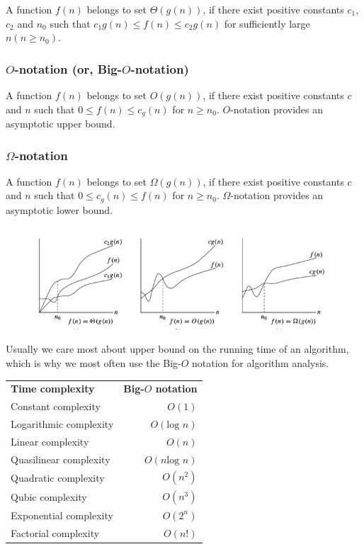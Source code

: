 \documentclass[a4paper,11pt]{book}
\begin{document}
A function $f(n)$ belongs to set $\Theta\left(g(n)\right)$, if there exist positive constants $c_1$, $c_2$ and $n_0$ such that $c_1g(n) \leq f(n) \leq c_2g(n)$ for sufficiently large $n (n \geq n_0)$.

\subsubsection{$O$-notation (or, Big-$O$-notation)}
A function $f(n)$ belongs to set $O\left(g(n)\right)$, if there exist positive constants $c$ and $n$ such that $0 \leq f(n) \leq c_g(n)$ for $n \geq n_0$. $O$-notation provides an asymptotic upper bound.

\subsubsection{$\Omega$-notation}
A function $f(n)$ belongs to set $\Omega\left(g(n)\right)$, if there exist positive constants $c$ and $n$ such that $0 \leq c_g(n) \leq f(n)$ for $n \geq n_0$. $\Omega$-notation provides an asymptotic lower bound.

\begin{figure}[ht]
	\centering
	\includegraphics[scale=0.5]{pic/time.jpg}
\end{figure}

\noindent Usually we care most about upper bound on the running time of an algorithm, which is why we most often use the Big-$O$ notation for algorithm analysis.

\begin{table}[ht]
\centering
\begin{tabular}{lr}
\textbf{Time complexity}        & \textbf{Big-$O$ notation}    \\
Constant complexity    & $O(1)$              \\
Logarithmic complexity & $O(\text{log } n)$   \\
Linear complexity      & $O(n)$              \\
Quasilinear complexity & $O(n \text{log } n)$ \\
Quadratic complexity   & $O(n^2)$            \\
Qubic complexity       & $O(n^3)$            \\
Exponential complexity & $O(2^n)$            \\
Factorial complexity   & $O(n!)$            
\end{tabular}
\end{table}
\end{document}
